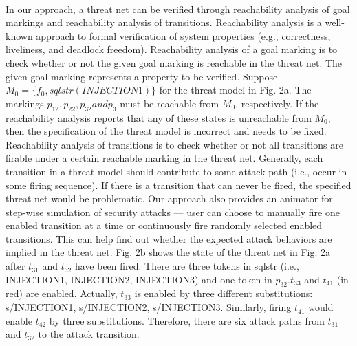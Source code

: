 \paragraph{}
In our approach, a threat net can be verified through reachability analysis of goal markings and reachability analysis of transitions. Reachability analysis is a well-known approach to formal verification of system properties (e.g., correctness, liveliness, and deadlock freedom). Reachability analysis of a goal marking is to check whether or not the given goal marking is reachable in the threat net.
The given goal marking represents a property to be verified. Suppose $M_0 = \{ f_0, sqlstr(INJECTION1)\}$ for the threat model in Fig. 2a. The markings $p_{12},p_{22},p_{32} and p_3$ must be reachable from $M_0$, respectively. If the reachability analysis reports that any of these states is unreachable from $M_0$, then the specification of the threat model is incorrect and needs to be fixed. Reachability analysis of transitions is to check whether or not all transitions are firable under a
certain reachable marking in the threat net. Generally, each transition in a threat model should contribute to some attack path (i.e., occur in some firing sequence). If there is a transition that can never be fired, the specified threat net
would be problematic. Our approach also provides an animator for step-wise simulation of security attacks — user can choose to manually fire one enabled transition at a time or continuously fire randomly selected enabled transitions.
This can help find out whether the expected attack behaviors are implied in the threat net. Fig. 2b shows the state of the threat net in Fig. 2a after $t_{31}$ and $t_{32}$ have been fired. There are three tokens in sqlstr (i.e., INJECTION1,
INJECTION2, INJECTION3) and one token in $p_{32}.t_{33}$ and $t_{41}$ (in red) are enabled. Actually, $t_{33}$ is enabled by three different substitutions: s/INJECTION1, s/INJECTION2, s/INJECTION3. Similarly, firing $t_{41}$ would enable $t_{42}$ by
three substitutions. Therefore, there are six attack paths
from $t_{31}$ and $t_{32}$ to the attack transition.
\newpage
